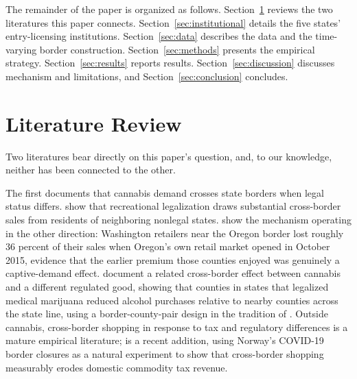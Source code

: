 \documentclass[12pt]{article}
\begin{document}
The remainder of the paper is organized as follows. Section~\ref{sec:lit} reviews the two literatures this
paper connects. Section~\ref{sec:institutional} details the five states' entry-licensing institutions.
Section~\ref{sec:data} describes the data and the time-varying border construction. Section~\ref{sec:methods}
presents the empirical strategy. Section~\ref{sec:results} reports results. Section~\ref{sec:discussion}
discusses mechanism and limitations, and Section~\ref{sec:conclusion} concludes.

\section{Literature Review}
\label{sec:lit}

Two literatures bear directly on this paper's question, and, to our knowledge, neither has been connected to
the other.

The first documents that cannabis demand crosses state borders when legal status differs. \citet{HaoCowan2020}
show that recreational legalization draws substantial cross-border sales from residents of neighboring
nonlegal states. \citet{HansenMillerWeber2020} show the mechanism operating in the other direction: Washington
retailers near the Oregon border lost roughly 36 percent of their sales when Oregon's own retail market opened
in October 2015, evidence that the earlier premium those counties enjoyed was genuinely a captive-demand
effect. \citet{BaggioChongKwon2020} document a related cross-border effect between cannabis and a different
regulated good, showing that counties in states that legalized medical marijuana reduced alcohol purchases
relative to nearby counties across the state line, using a border-county-pair design in the tradition of
\citet{DubeLesterReich2010}. Outside cannabis, cross-border shopping in response to tax and regulatory
differences is a mature empirical literature; \citet{FribergEtAl2024} is a recent addition, using Norway's
COVID-19 border closures as a natural experiment to show that cross-border shopping measurably erodes domestic
commodity tax revenue.
\end{document}

